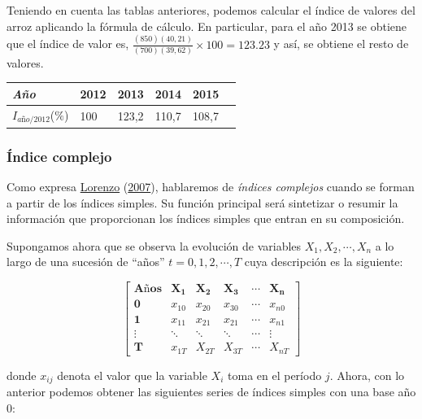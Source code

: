\documentclass[
  11pt,
]{book}
\begin{document}
Teniendo en cuenta las tablas anteriores, podemos calcular el índice de valores del arroz aplicando la fórmula de cálculo. En particular, para el año 2013 se obtiene que el índice de valor es,
\(\frac{(850)(40,21)}{(700)(39,62)}\times 100=123.23\)
y así, se obtiene el resto de valores.

\begin{longtable}[]{@{}llllll@{}}
\toprule
\emph{Año} & 2012 & 2013 & 2014 & 2015 & \\
\midrule
\endhead
\(I_{año/2012}\)(\(\%\)) & 100 & 123,2 & 110,7 & 108,7 & \\
\bottomrule
\end{longtable}

\hypertarget{indicecomplejo}{%
\subsubsection{Índice complejo}\label{indicecomplejo}}

Como expresa \protect\hyperlink{ref-lorenzo2007estadistica}{Lorenzo} (\protect\hyperlink{ref-lorenzo2007estadistica}{2007}), hablaremos de \emph{índices complejos} cuando se forman a partir de los índices simples. Su función principal será sintetizar o resumir la información que proporcionan los índices simples que entran en su composición.

Supongamos ahora que se observa la evolución de variables \(X_1,X_2,\cdots, X_n\) a lo largo de una sucesión de ``años'' \(t=0,1,2,\cdots,T\) cuya descripción es la siguiente:

\[
\begin{equation}
\begin{bmatrix}
  \textbf{Años} & \mathbf{X_1} & \mathbf{X_2} & \mathbf{X_3} &\cdots & \mathbf{X_n}\\
     \mathbf{0}& x_{10} & x_{20} & x_{30} & \cdots & x_{n0}\\
    \mathbf{1} & x_{11} & x_{21} & x_{21} & \cdots & x_{n1}\\
     \vdots & \ddots & \ddots & \ddots & \cdots & \vdots\\
     \mathbf{T} & x_{1T} & X_{2T} & X_{3T} & \cdots & X_{nT}
    \end{bmatrix}
\end{equation}
\]

donde \(x_{ij}\) denota el valor que la variable \(X_i\) toma en el período \(j\). Ahora, con lo anterior podemos obtener las siguientes series de índices simples con una base año 0:
\end{document}
